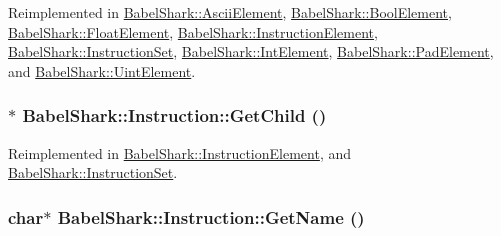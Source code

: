 Reimplemented in \hyperlink{class_babel_shark_1_1_ascii_element_a10391d6cea4ab7ad45be370fed9d4d0}{BabelShark::AsciiElement}, \hyperlink{class_babel_shark_1_1_bool_element_7908eb1bccd3d590bfa3da4735bcec76}{BabelShark::BoolElement}, \hyperlink{class_babel_shark_1_1_float_element_7c8e429b760e1e24985e3046d4640674}{BabelShark::FloatElement}, \hyperlink{class_babel_shark_1_1_instruction_element_6c98ad187a2a12399eb90a8cf9e2aec0}{BabelShark::InstructionElement}, \hyperlink{class_babel_shark_1_1_instruction_set_8456f55059620a8a971b3f1f39d62fc0}{BabelShark::InstructionSet}, \hyperlink{class_babel_shark_1_1_int_element_c6999927ab0af83714479752fda88f9b}{BabelShark::IntElement}, \hyperlink{class_babel_shark_1_1_pad_element_aa1ddf32a942c6ea6c63eefe67f2521d}{BabelShark::PadElement}, and \hyperlink{class_babel_shark_1_1_uint_element_06162488c1a349e17d165d038e5cd646}{BabelShark::UintElement}.\hypertarget{class_babel_shark_1_1_instruction_709aac58cbdc516fcedc3bbcdd94795d}{
\subsubsection[{GetChild}]{ $\ast$ BabelShark::Instruction::GetChild ()}}
\label{class_babel_shark_1_1_instruction_709aac58cbdc516fcedc3bbcdd94795d}




Reimplemented in \hyperlink{class_babel_shark_1_1_instruction_element_747402ebce23651b77cad508c223ba62}{BabelShark::InstructionElement}, and \hyperlink{class_babel_shark_1_1_instruction_set_3c5af90b398f3ec28bc4248630f87c63}{BabelShark::InstructionSet}.\hypertarget{class_babel_shark_1_1_instruction_681336e7e2ff12cfbe4a67ac657108da}{
\subsubsection[{GetName}]{\setlength{\rightskip}{0pt plus 5cm}char$\ast$ BabelShark::Instruction::GetName ()}}
\label{class_babel_shark_1_1_instruction_681336e7e2ff12cfbe4a67ac657108da}


